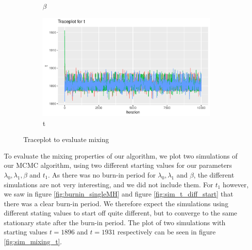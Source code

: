 \begin{figure}[h]
\begin{subfigure}[b]{0.49\textwidth}
        \caption{$\beta$ }
        \label{fig:}
    \end{subfigure}
    \begin{subfigure}[b]{0.49\textwidth}
        \centering
        \includegraphics[width = \textwidth]{Images/mixing_t.pdf}
        \caption{t}
        \label{fig:}
    \end{subfigure}
    \caption{Traceplot to evaluate mixing }
    \label{fig:sim_t_big_n}
\end{figure}






To evaluate the mixing properties of our algorithm, we plot two simulations of our MCMC algorithm, using two different starting values for our parameters $\lambda_0, \lambda_1, \beta$ and $t_1$. As there was no burn-in period for $\lambda_0, \lambda_1$ and $\beta$, the different simulations are not very interesting, and we did not include them. For $t_1$ however, we saw in figure \ref{fig:burnin_singleMH} and figure \ref{fig:sim_t_diff_start} that there was a clear burn-in period. We therefore expect the simulations using different stating values to start off quite different, but to converge to the same stationary state after the burn-in period. The plot of two simulations with starting values $t = 1896$ and $t = 1931$ respectively can be seen in figure \ref{fig:sim_mixing_t}.

